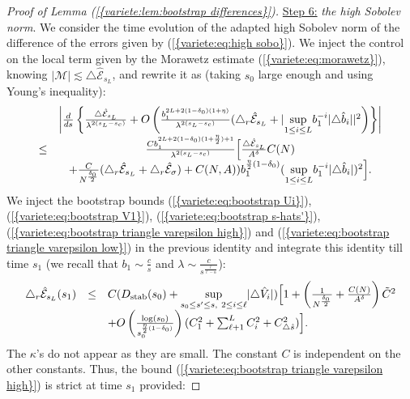 \documentclass[11pt,a4paper,reqno]{amsart}
\theoremstyle{remark}
\numberwithin{equation}{section}
\begin{document}
\begin{proof}[Proof of Lemma {{\rm (\ref{{variete:lem:bootstrap differences}})}}]
\underline{Step 6:}  \emph{the high Sobolev norm}. We consider the time evolution of the adapted high Sobolev norm of the difference of the errors given by {{\rm (\ref{{variete:eq:high sobo}})}}. We inject the control on the local term given by the Morawetz estimate {{\rm (\ref{{variete:eq:morawetz}})}}, knowing $|\mathcal{M}|\lesssim \triangle \hat{\mathcal{E}}_{s_L}$, and rewrite it as (taking $s_0$ large enough and using Young's inequality):
$$
\begin{array}{r c l}
&\left| \frac{d}{ds}\left\{ \frac{\triangle \hat{\mathcal{E}}_{s_L}}{\lambda^{2(s_L-s_c)}}+O \left( \frac{b_1^{2L+2(1-\delta_0)(1+\eta)}}{\lambda^{2(s_L-s_c)}}(\triangle_r \hat{\mathcal{E}}_{s_L}+|\underset{1\leq i \leq L}{\text{sup}}b_1^{-i}|\triangle \hat{b}_i||^2 \right) \right\} \right| \\
\leq& \frac{Cb_1^{2L+2(1-\delta_0)(1+\frac{\eta}{2})+1}}{\lambda^{2(s_L-s_c)}}\Bigl{[}\frac{\triangle \hat{\mathcal{E}}_{s_L}}{A^{\delta}}C(N) \\
&+\frac{C}{N^{\frac{\delta_0}{2}}}(\triangle_r \hat{\mathcal{E}}_{s_L}+\triangle_r \hat{\mathcal{E}}_{\sigma})+C(N,A))b_1^{\frac{\eta}{2}(1-\delta_0)}(\underset{1\leq i \leq L}{\text{sup}}b_1^{-i}|\triangle \hat{b}_i|)^2\Bigr{]}. \\
\end{array}
$$
We inject the bootstrap bounds {{\rm (\ref{{variete:eq:bootstrap Ui}})}}, {{\rm (\ref{{variete:eq:bootstrap V1}})}}, {{\rm (\ref{{variete:eq:bootstrap s-hats'}})}}, {{\rm (\ref{{variete:eq:bootstrap triangle varepsilon high}})}} and {{\rm (\ref{{variete:eq:bootstrap triangle varepsilon low}})}} in the previous identity and integrate this identity till time $s_1$ (we recall that $b_1\sim \frac{c}{s}$ and $\lambda \sim \frac{c}{s^{\frac{\ell}{\ell-\alpha}}}$):
\begin{equation} \label{variete:bootstrap:condition mathcalEsL}
\begin{array}{r c l}
\triangle_r \hat{\mathcal{E}}_{s_L}(s_1) &\leq& C(D_{\text{stab}}(s_0)+\underset{s_0\leq s' \leq s, \ 2\leq i \leq \ell}{\text{sup}}|\triangle \hat{V}_i|) \Bigl{[} 1+\left(\frac{1}{N^{\frac{\delta_0}{2}}}+\frac{C(N)}{A^{\delta}}\right)\tilde{C}^2 \\
&&+O\left(\frac{\text{log}(s_0)}{s_0^{\frac{\eta}{2}(1-\delta_0)}}\right)(C_1^2+\sum_{\ell+1}^{L}C_i^2+C_{\triangle \hat{s}}^2)\Bigr{]}.
\end{array}
\end{equation}
The $\kappa$'s do not appear as they are small. The constant $C$ is independent on the other constants. Thus, the bound {{\rm (\ref{{variete:eq:bootstrap triangle varepsilon high}})}} is strict at time $s_1$ provided:

\end{proof}
\end{document}
